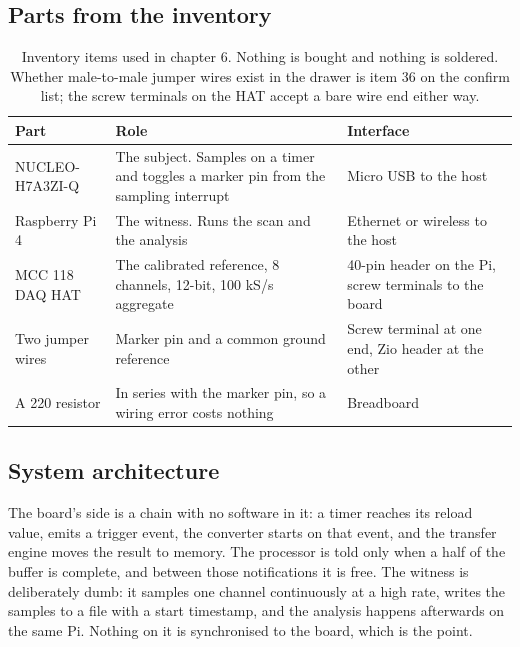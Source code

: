 \subsection*{Parts from the inventory}

\begin{table}[H]\centering\small
\begin{tabular}{p{40mm}p{66mm}p{40mm}}
\toprule
Part & Role & Interface \\
\midrule
NUCLEO-H7A3ZI-Q & The subject. Samples on a timer and toggles a marker pin from the sampling interrupt & Micro USB to the host \\
Raspberry Pi 4 & The witness. Runs the scan and the analysis & Ethernet or wireless to the host \\
MCC 118 DAQ HAT & The calibrated reference, 8 channels, 12-bit, 100 kS/s aggregate & 40-pin header on the Pi, screw terminals to the board \\
Two jumper wires & Marker pin and a common ground reference & Screw terminal at one end, Zio header at the other \\
A 220 \textohm{} resistor & In series with the marker pin, so a wiring error costs nothing & Breadboard \\
\bottomrule
\end{tabular}
\caption{Inventory items used in chapter 6. Nothing is bought and nothing is soldered. Whether male-to-male jumper wires exist in the drawer is item 36 on the confirm list; the screw terminals on the HAT accept a bare wire end either way.}
\end{table}

\subsection*{System architecture}


The board's side is a chain with no software in it: a timer reaches its reload
value, emits a trigger event, the converter starts on that event, and the
transfer engine moves the result to memory. The processor is told only when a
half of the buffer is complete, and between those notifications it is free. The
witness is deliberately dumb: it samples one channel continuously at a high
rate, writes the samples to a file with a start timestamp, and the analysis
happens afterwards on the same Pi. Nothing on it is synchronised to the board,
which is the point.

